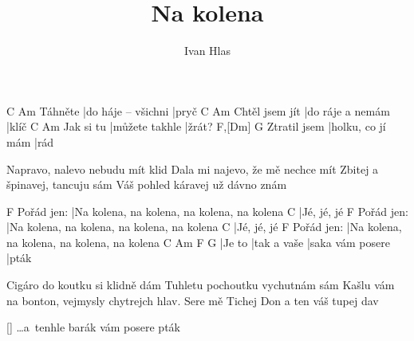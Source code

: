 \documentclass{song}
\title{Na kolena}
\author{Ivan Hlas}
\begin{document}
\strophe
        C                   Am
Táhněte |do háje -- všichni |pryč
               C                Am
Chtěl jsem jít |do ráje a nemám |klíč
          C              Am
Jak si tu |můžete takhle |žrát?
             F,[Dm]           G
Ztratil jsem |holku, co jí mám |rád
\endstrophe

\strophe*
Napravo, nalevo nebudu mít klid
Dala mi najevo, že mě nechce mít
Zbitej a špinavej, tancuju sám
Váš pohled káravej už dávno znám
\endstrophe

           F
Pořád jen: |Na kolena, na kolena, na kolena, na kolena
C
|Jé, jé, jé
           F
Pořád jen: |Na kolena, na kolena, na kolena, na kolena
C
|Jé, jé, jé
           F
Pořád jen: |Na kolena, na kolena, na kolena, na kolena
C      Am          F                G
|Je to |tak a vaše |saka vám posere |pták
\endstrophe

\strophe*
Cigáro do koutku si klidně dám
Tuhletu pochoutku vychutnám sám
Kašlu vám na bonton, vejmysly chytrejch hlav.
Sere mě Tichej Don a ten váš tupej dav
\endstrophe

\ref{} \ldots a~tenhle barák vám posere pták
\end{document}
